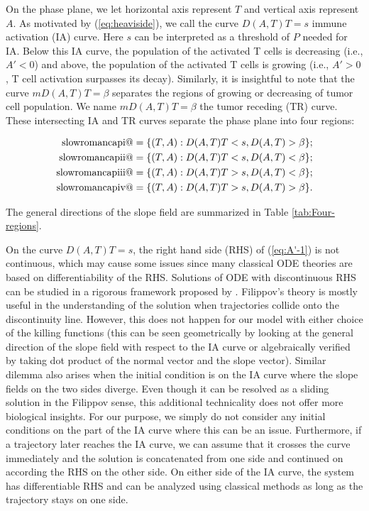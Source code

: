 \documentclass[review,authoryear]{elsarticle}
\makeatletter
\newcommand*{\rom}[1]{\expandafter\@slowromancap\romannumeral #1@}
\makeatother
\begin{document}
On the phase plane, we let horizontal axis
represent $T$ and vertical axis represent $A$. As motivated by (\ref{eq:heaviside}), we call the curve
$D(A,T)T=s$ immune activation (IA) curve. Here $s$ can be interpreted as a threshold of $P$ needed for IA. Below this IA curve, the population
of the activated T cells is decreasing (i.e., $A'<0$) and above, the population
of the activated T cells is growing (i.e., $A'>0$, T cell activation surpasses its decay).
Similarly, it is insightful to note that the curve $mD(A,T)T=\beta$
separates the regions of growing or decreasing of tumor cell population. We name
$mD(A,T)T=\beta$ the tumor receding (TR) curve. These intersecting IA and TR curves separate
the phase plane into four regions: 
\begin{linenomath*}
\begin{align*} 
\text{\rom{1}} &=  \{(T,A): D(A,T)T<s, D(A,T)>\beta \}; \\ 
\text{\rom{2}} &=  \{(T,A): D(A,T)T<s, D(A,T)<\beta \}; \\ 
\text{\rom{3}} &=  \{(T,A): D(A,T)T>s, D(A,T)<\beta \}; \\ 
\text{\rom{4}} &=  \{(T,A): D(A,T)T>s, D(A,T)>\beta \}. 
\end{align*}
\end{linenomath*}
The general directions of the slope field are summarized in Table \ref{tab:Four-regions}. 

On the curve $D(A,T)T=s$, the right hand side (RHS) of (\ref{eq:A'-1})
is not continuous, which may cause some issues since many classical
ODE theories are based on differentiability of the RHS. Solutions of ODE
with discontinuous RHS can be studied in a rigorous framework proposed
by \citet{Filippov1988}. Filippov's theory is mostly useful
in the understanding of the solution when trajectories collide onto the
discontinuity line. However, this does not happen for our model with
either choice of the killing functions (this can be seen geometrically by looking
at the general direction of the slope field with respect to the IA
curve or algebraically verified by taking dot product of the normal
vector and the slope vector). Similar dilemma also arises when the
initial condition is on the IA curve where the slope fields on the
two sides diverge. Even though it can be resolved as a sliding solution
in the Filippov sense, this additional technicality does not offer more
biological insights. For our
purpose, we simply do not consider any initial conditions on the part of the IA
curve where this can be an issue. Furthermore, if a trajectory later reaches the IA curve, we
can assume that it crosses the curve immediately and the solution
is concatenated from one side and continued on according the RHS on
the other side. On either side of the IA curve, the system has differentiable RHS and
can be analyzed using classical methods as long as the trajectory
stays on one side. 
\end{document}
